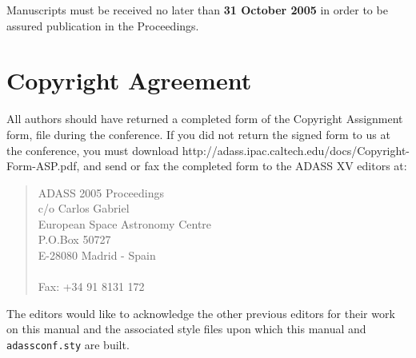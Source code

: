 \documentclass[11pt,twoside]{article}
\begin{document}
Manuscripts must be received no later than {\bf 31 October 2005}
in order to be assured publication in the Proceedings.  

\section{Copyright Agreement}
\label{copyright}

All authors should have returned a completed form of the Copyright
Assignment form, file during the conference. If you did not return the
signed form to us at the conference, you must download
%
{http://adass.ipac.caltech.edu/docs/Copyright-Form-ASP.pdf},
and send or fax the completed form to the ADASS XV editors at:
\begin{quote}
     ADASS 2005 Proceedings\\
     c/o Carlos Gabriel \\
     European Space Astronomy Centre \\
     P.O.Box 50727\\
     E-28080 Madrid - Spain \\
     ~\\
     Fax: +34 91 8131 172
\end{quote}

\acknowledgements

The editors would like to acknowledge the other previous editors
for their work on this manual and the associated style files upon which
this manual and \verb+adassconf.sty+ are built.
\end{document}
